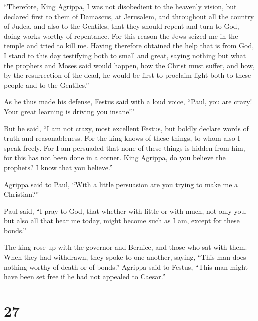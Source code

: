  ``Therefore, King Agrippa, I was not disobedient to the
heavenly vision,  but declared first to them of Damascus,
at Jerusalem, and throughout all the country of Judea, and also to the
Gentiles, that they should repent and turn to God, doing works worthy of
repentance.  For this reason the Jews seized me in the
temple and tried to kill me.  Having therefore obtained
the help that is from God, I stand to this day testifying both to small
and great, saying nothing but what the prophets and Moses said would
happen,  how the Christ must suffer, and how, by the
resurrection of the dead, he would be first to proclaim light both to
these people and to the Gentiles.''

 As he thus made his defense, Festus said with a loud
voice, ``Paul, you are crazy! Your great learning is driving you
insane!''

 But he said, ``I am not crazy, most excellent Festus,
but boldly declare words of truth and reasonableness. 
For the king knows of these things, to whom also I speak freely. For I
am persuaded that none of these things is hidden from him, for this has
not been done in a corner.  King Agrippa, do you believe
the prophets? I know that you believe.''

 Agrippa said to Paul, ``With a little persuasion are you
trying to make me a Christian?''

 Paul said, ``I pray to God, that whether with little or
with much, not only you, but also all that hear me today, might become
such as I am, except for these bonds.''

 The king rose up with the governor and Bernice, and
those who sat with them.  When they had withdrawn, they
spoke to one another, saying, ``This man does nothing worthy of death or
of bonds.''  Agrippa said to Festus, ``This man might
have been set free if he had not appealed to Caesar.''

\hypertarget{section-26}{%
\section{27}\label{section-26}}


